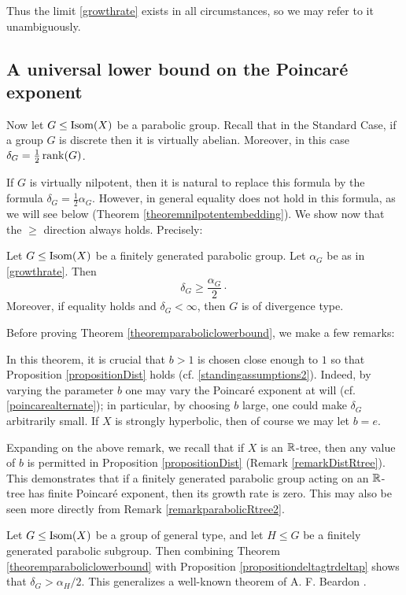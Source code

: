 Thus the limit \eqref{growthrate} exists in all circumstances, so we may refer to it unambiguously.

\subsection{A universal lower bound on the Poincar\'e exponent}
Now let $G\leq\operatorname{Isom}(X)$ be a parabolic group. Recall that in the Standard Case, if a group $G$ is discrete then it is virtually abelian. Moreover, in this case $\delta_G = \frac12\operatorname{rank}(G)$.

If $G$ is virtually nilpotent, then it is natural to replace this formula by the formula $\delta_G = \frac12\alpha_G$. However, in general equality does not hold in this formula, as we will see below (Theorem \ref{theoremnilpotentembedding}). We show now that the $\geq$ direction always holds. Precisely:

\begin{theorem}
\label{theoremparaboliclowerbound}
Let $G\leq\operatorname{Isom}(X)$ be a finitely generated parabolic group. Let $\alpha_G$ be as in \eqref{growthrate}. Then
\begin{equation}
\label{paraboliclowerbound}
\delta_G \geq \frac{\alpha_G}{2}\cdot
\end{equation}
Moreover, if equality holds and $\delta_G < \infty$, then $G$ is of divergence type.
\end{theorem}

Before proving Theorem \ref{theoremparaboliclowerbound}, we make a few remarks:

\begin{remark}
In this theorem, it is crucial that $b > 1$ is chosen close enough to $1$ so that Proposition \ref{propositionDist} holds (cf. \6\ref{standingassumptions2}). Indeed, by varying the parameter $b$ one may vary the Poincar\'e exponent at will (cf. \eqref{poincarealternate}); in particular, by choosing $b$ large, one could make $\delta_G$ arbitrarily small. If $X$ is strongly hyperbolic, then of course we may let $b = e$.
\end{remark}
\begin{remark}
Expanding on the above remark, we recall that if $X$ is an $\R$-tree, then any value of $b$ is permitted in Proposition \ref{propositionDist} (Remark \ref{remarkDistRtree}). This demonstrates that if a finitely generated parabolic group acting on an $\R$-tree has finite Poincar\'e exponent, then its growth rate is zero. This may also be seen more directly from Remark \ref{remarkparabolicRtree2}.
\end{remark}
\begin{remark}
Let $G\leq\operatorname{Isom}(X)$ be a group of general type, and let $H\leq G$ be a finitely generated parabolic subgroup. Then combining Theorem \ref{theoremparaboliclowerbound} with Proposition \ref{propositiondeltagtrdeltap} shows that $\delta_G > \alpha_H/2$. This generalizes a well-known theorem of A. F. Beardon \cite[Theorem 7]{Beardon1}.
\end{remark}

